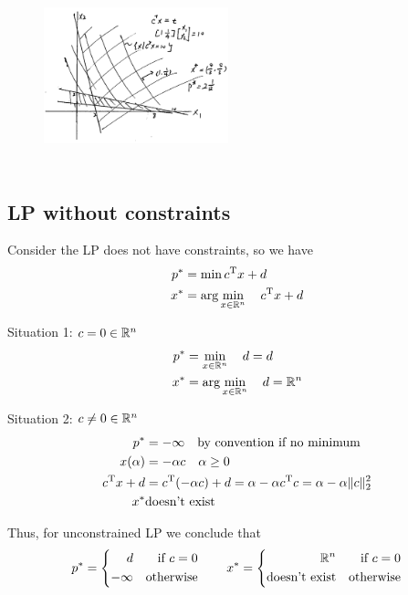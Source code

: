 \begin{figure}
	\centering
	\includegraphics[width=2.1in,height=2.1in]{figures/ch06/figure5.png}
\end{figure}



\subsection{LP without constraints}

Consider the LP does not have constraints, so we have
\begin{align*}
	p^* &= \min c^{{\rm T}}x+d\\
	x^* &= \arg \min_{x\in \mathbb{R}^n} \quad c^{{\rm T}}x+d
\end{align*}

\vspace{0.5cm}
Situation 1: $c = 0 \in \mathbb{R}^n$
\begin{align*}
	p^* &= \min_{x\in \mathbb{R}^n} \quad d=d\\
	x^* &= \arg \min_{x\in \mathbb{R}^n} \quad d = \mathbb{R}^n
\end{align*}

Situation 2: $c \neq 0 \in \mathbb{R}^n$
\begin{align*}
	p^* &= -\infty\quad \text{by convention if no minimum}\\
	x(\alpha) &= -\alpha c \quad \alpha \geq 0\\
	c^{{\rm T}}x + d &= c^{{\rm T}}(-\alpha c) + d = \alpha - \alpha c^{{\rm T}}c = \alpha - \alpha\Vert c\Vert^2_2\\
	x^* &\text{doesn't exist}
\end{align*}

Thus, for unconstrained LP we conclude that
$$
p^*=\left\{
\begin{aligned}
d &  & \text{if } c=0 \\
-\infty &  & \text{otherwise}
\end{aligned}
\right.
\qquad
x^*=\left\{
\begin{aligned}
\mathbb{R}^n & &\text{if } c=0 \\
\text{doesn't exist} &  & \text{otherwise}
\end{aligned}
\right.
$$

